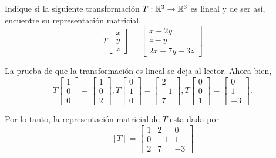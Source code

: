 \begin{problema}
 Indique si la siguiente transformaci\'on $T:\mathbb{R}^{3}\to \mathbb{R}^{3}$ es lineal y de ser as\'i, encuentre su representaci\'on
matricial.
\begin{equation}
\label{trans_exmp}
 T\begin{bmatrix}
    x\\y\\z
   \end{bmatrix}=
   \begin{bmatrix}
    x+2y \\ z-y\\ 2x+7y-3z
   \end{bmatrix}
\end{equation}

\end{problema}

\begin{solucion}
 La prueba de que la transformaci\'on es lineal se deja al lector. Ahora bien,
 $$
T\begin{bmatrix}
  1\\0\\0
 \end{bmatrix}
=\begin{bmatrix}
  1\\0\\2
 \end{bmatrix},
 T\begin{bmatrix}
  0\\1\\0
 \end{bmatrix}
=\begin{bmatrix}
  2\\-1\\7
 \end{bmatrix},
T\begin{bmatrix}
  0\\0\\1
 \end{bmatrix}
=\begin{bmatrix}
  0\\1\\-3
 \end{bmatrix}.
 $$

 Por lo tanto, la representaci\'on matricial de $T$ esta dada por
 $$
[T]=\begin{bmatrix}
1 & 2 & 0 \\
0 & -1 & 1 \\
2 & 7 & -3
 \end{bmatrix}
 $$
\end{solucion}


